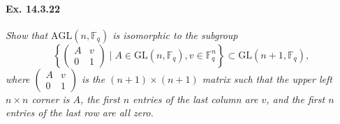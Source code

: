 \documentclass[11pt,a4paper]{article}
\newcommand{\F}{\mathbb{F}}
\begin{document}
  \paragraph{Ex. 14.3.22}{\it  Show that $\mathrm{AGL}(n,\F_q)$ is isomorphic to the subgroup
  $$
  \left\{
  \begin{pmatrix}
  A & v\\
  0 & 1
  \end{pmatrix}
  \mid A \in \mathrm{GL}(n,\F_q), v \in \F_q^n
  \right\}
  \subset \mathrm{GL}(n+1,\F_q),
  $$
  where $\begin{pmatrix}
  A & v\\
  0 & 1
  \end{pmatrix}
$ is the $(n+1) \times (n+1)$ matrix such that the upper left $n\times n$ corner is $A$, the first $n$ entries of the last column are $v$, and the first $n$ entries of the last row are all zero.

}
\end{document}
